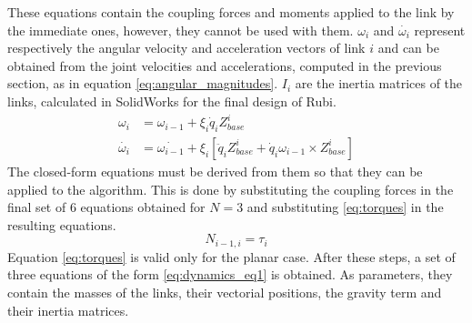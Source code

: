 These equations contain the coupling forces and moments applied to the link by the immediate ones, however, they cannot be used with them. 
$\omega_{i}$ and $\dot{\omega_{i}}$ represent respectively the angular velocity and acceleration vectors of link $i$ and can be obtained from the joint velocities and accelerations, computed in the previous section, as in equation \ref{eq:angular_magnitudes}.
$I_{i}$ are the inertia matrices of the links, calculated in SolidWorks for the final design of Rubi.
\begin{equation}
\label{eq:angular_magnitudes}	
	\begin{aligned}
		\omega_{i} &= \omega_{i-1} + \xi_{i}\dot{q}_{i}Z_{base}^i\\
		\dot{\omega_{i}} &= \dot{\omega_{i-1}} + \xi_{i}[\ddot{q}_{i}Z_{base}^i + \dot{q}_{i}\omega_{i-1} \times Z_{base}^i]
	\end{aligned}
\end{equation}
The closed-form equations must be derived from them so that they can be applied to the algorithm.
This is done by substituting the coupling forces in the final set of 6 equations obtained for $N=3$ and substituting \ref{eq:torques} in the resulting equations.
\begin{equation}
\label{eq:torques}
	N_{i - 1 , i} = \tau_{i}
\end{equation}
Equation \ref{eq:torques} is valid only for the planar case.
After these steps, a set of three equations of the form \ref{eq:dynamics_eq1} is obtained. 
As parameters, they contain the masses of the links, their vectorial positions, the gravity term and their inertia matrices. 


